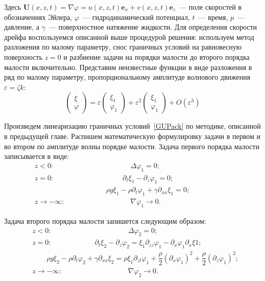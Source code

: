 Здесь $ \mathbf{U}\left( x, z, t \right) = \nabla \varphi = u \left( x, z, t\right) \mathbf{e}_{x}+v \left( x, z, t\right) \mathbf{e}_{z} $~--- поле скоростей в обозначениях Эйлера, $ \varphi $~--- гидродинамический потенциал,  $ t $~--- время, $ p $~--- давление, а $ \gamma $~--- поверхностное натяжение жидкости. Для определения скорости дрейфа воспользуемся описанной выше процедурой решения: используем метод разложения по малому параметру, снос граничных условий на равновесную поверхность $ z=0 $  и разбиение задачи на порядки малости до второго порядка малости включительно. Представим неизвестные функции в виде разложения в ряд по малому параметру, пропорциональному амплитуде волнового движения   $ \varepsilon = \zeta k $:
\begin{equation*}
\begin{pmatrix}
\xi
\\
\varphi
\end{pmatrix}= \varepsilon \begin{pmatrix}
\xi_{1}
\\
\varphi_{1}\end{pmatrix}+ \varepsilon^{2} \begin{pmatrix}
\xi_{1}
\\
\varphi_{1}\end{pmatrix}+ O\left( \varepsilon^{3}\right)
\end{equation*}
	  	
Произведем линеаризацию граничных условий~\eqref{GUPack} по методике, описанной в предыдущей главе. Распишем математическую формулировку задачи в первом и во втором по амплитуде волны порядке малости. Задача первого порядка малости записывается в виде:
\begin{align}
&z<0 : \mspace{192mu} \Delta \varphi_{1}=0; \label{EulPack1} \mspace{192mu}
\\
&z=0 : \mspace{172mu} \partial_{t}\xi_{1} -\partial_{z} \varphi_{1}=0 ; \label{GUPack1}
\\
& \mspace{180mu}  \rho g \xi_{1}-\rho \partial_{t} \varphi_{1}+\gamma \partial_{xx}\xi_{1}=0 ; \label{GUPack2}
\\
& z\rightarrow -\infty :\mspace{165mu}\nabla \varphi_{1} \rightarrow 0.\label{BeskPack1}
\end{align}

Задача второго порядка малости запишется следующим образом: 
\begin{align}
&z<0 : \mspace{192mu} \Delta \varphi_{2}=0; \label{EulPack2} \mspace{192mu}
\\
&z=0 : \mspace{108mu} \partial_{t}\xi_{2} -\partial_{z} \varphi_{2}=\xi_{1} \partial_{zz}\varphi_{1} - \partial_{x} \varphi_{1} \partial_{x} \xi{1} ; 
\\
& \qquad  \rho g \xi_{2}-\rho \partial_{t} \varphi_{2}+\gamma \partial_{xx}\xi_{2}=\rho \xi_{1} \partial_{zt} \varphi_{1} + \dfrac{\rho}{2} \left(\partial_{x} \varphi_{1} \right)^{2}+ \dfrac{\rho}{2} \left(\partial_{z} \varphi_{1} \right)^{2} ;
\\
& z\rightarrow -\infty :\mspace{165mu} \nabla \varphi_{2} \rightarrow 0.\label{BeskPack2}
\end{align}


